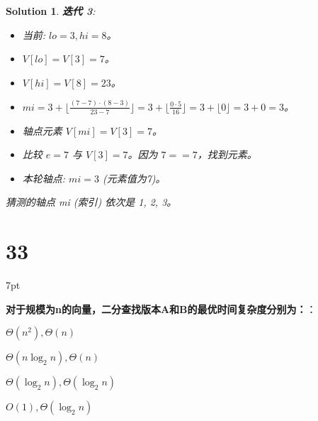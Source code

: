 \documentclass[UTF8]{report}
\newtheorem{solution}{Solution}
\theoremstyle{MyLineTheoremStyle} %
\theoremstyle{MyBlockTheoremStyle} %
\theoremstyle{MySubsubsectionStyle} %
\newenvironment{graybox}{%
        \def\FrameCommand{%
        \hspace{1pt}%
        {\color{gray}\small \vrule width 2pt}%
        {\color{graybox_color}\vrule width 4pt}%
        \colorbox{graybox_color}%
        }%
        \MakeFramed{\advance\hsize-\width\FrameRestore}%
        \noindent\hspace{-4.55pt}%
        \begin{adjustwidth}{}{7pt}%
        \vspace{2pt}\vspace{2pt}%
        }
        {%
        \vspace{2pt}\end{adjustwidth}\endMakeFramed%
        }
\begin{document}
\begin{solution}
\textbf{迭代 3}:
\begin{itemize}
    \item 当前: $lo = 3, hi = 8$。
    \item $V[lo] = V[3] = 7$。
    \item $V[hi] = V[8] = 23$。
    \item $mi = 3 + \lfloor \frac{(7 - 7) \cdot (8 - 3)}{23 - 7} \rfloor = 3 + \lfloor \frac{0 \cdot 5}{16} \rfloor = 3 + \lfloor 0 \rfloor = 3 + 0 = 3$。
    \item 轴点元素 $V[mi] = V[3] = 7$。
    \item 比较 $e=7$ 与 $V[3]=7$。因为 $7 == 7$，找到元素。
    \item 本轮轴点: $mi=3$ (元素值为7)。
\end{itemize}
猜测的轴点 mi (索引) 依次是 1, 2, 3。

\end{solution}



\section*{33}

\begin{graybox}
\textbf{对于规模为n的向量，二分查找版本A和B的最优时间复杂度分别为：}：
\begin{circledenum}
    \item $\Theta(n^2), \Theta(n)$
    \item $\Theta(n\log_{2}n), \Theta(n)$
    \item $\Theta(\log_{2}n), \Theta(\log_{2}n)$
    \item $O(1), \Theta(\log_{2}n)$
\end{circledenum}
\end{graybox}
\end{document}
